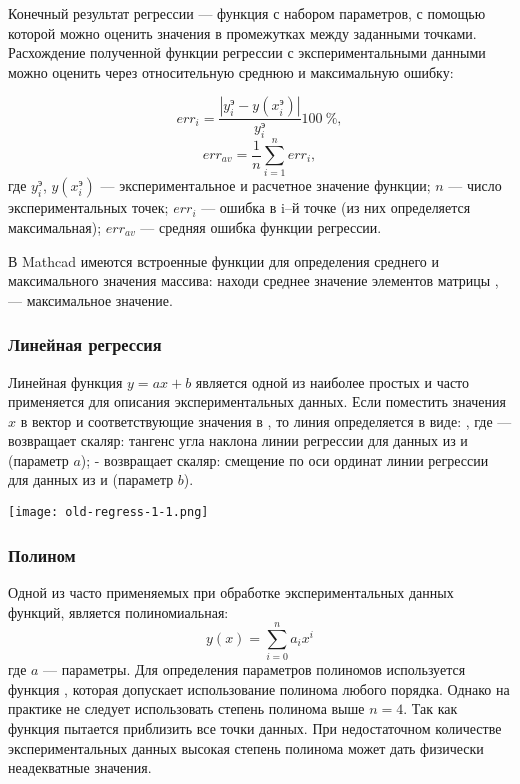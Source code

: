 Конечный результат регрессии --- функция с набором параметров, с помощью которой можно оценить значения в промежутках между заданными точками. Расхождение полученной функции регрессии с экспериментальными данными можно оценить через относительную среднюю и максимальную ошибку:

\begin{equation}
	err_i= \dfrac{\left| y_i^э - y(x^э_i) \right|}{y_i^э} 100\ \% ,
\end{equation}
\begin{equation}
	err_{av}=\dfrac{1}{n}\sum\limits_{i=1}^{n} err_i ,
\end{equation}
где $y_i^э$, $y(x_i^э)$ --- экспериментальное и расчетное значение функции; $n$ --- число экспериментальных точек; $err_i$ --- ошибка в i–й точке (из них определяется максимальная); $err_{av}$ --- средняя ошибка функции регрессии.

В Mathcad имеются встроенные функции для определения среднего и максимального значения массива:  находи среднее значение элементов матрицы ,  --- максимальное значение.

\subsubsection{Линейная регрессия}
Линейная функция $y=ax +b $ является одной из наиболее простых и часто применяется для описания экспериментальных данных. 
Если поместить значения $x$ в вектор  и соответствующие значения  в , то линия определяется в виде:
,
где  --- возвращает скаляр: тангенс угла наклона линии регрессии для данных из  и  (параметр $a$);
 - возвращает скаляр: смещение по оси ординат линии регрессии для данных из  и  (параметр $b$).


\begin{center}
	\texttt{[image: old-regress-1-1.png]}
\end{center}

\subsubsection{Полином}
Одной из  часто применяемых при обработке экспериментальных данных функций, является полиномиальная:
\begin{equation}
	y(x)= \sum_{i=0}^{n} a_i x^i
\end{equation}
где $a$ --- параметры. Для определения параметров полиномов используется функция , которая допускает использование полинома любого порядка. Однако на практике не следует использовать степень полинома выше $n = 4$. Так как функция  пытается приблизить все точки данных. При недостаточном количестве экспериментальных данных высокая степень полинома может дать физически неадекватные значения.

